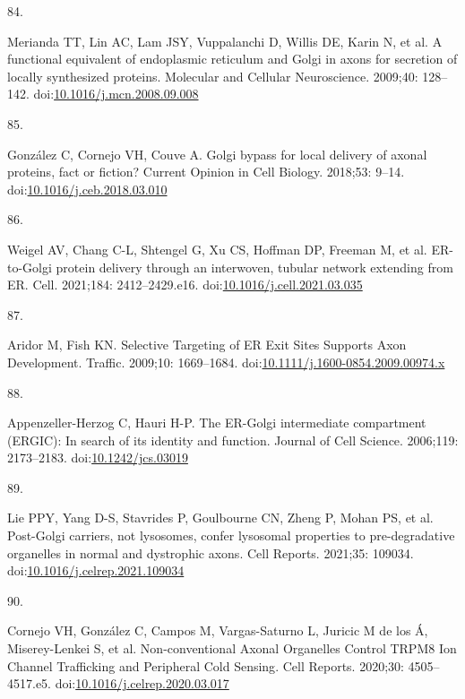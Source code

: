 \documentclass[
  12pt,
  a4paper,
]{book}
\newlength{\cslhangindent}
\newlength{\csllabelwidth}
\newlength{\cslentryspacingunit} %
\newenvironment{CSLReferences}[2] %
 {%
  \setlength{\parindent}{0pt}
  \ifodd #1
  \let\oldpar\par
  \def\par{\hangindent=\cslhangindent\oldpar}
  \fi
  \setlength{\parskip}{#2\cslentryspacingunit}
 }%
 {}
\newcommand{\CSLLeftMargin}[1]{\parbox[t]{\csllabelwidth}{#1}}
\newcommand{\CSLRightInline}[1]{\parbox[t]{\linewidth - \csllabelwidth}{#1}\break}
\begin{document}
\begin{CSLReferences}{0}{0}
\leavevmode{}%
\CSLLeftMargin{84. }%
\CSLRightInline{Merianda TT, Lin AC, Lam JSY, Vuppalanchi D, Willis DE, Karin N, et al. A functional equivalent of endoplasmic reticulum and {Golgi} in axons for secretion of locally synthesized proteins. Molecular and Cellular Neuroscience. 2009;40: 128--142. doi:\href{https://doi.org/10.1016/j.mcn.2008.09.008}{10.1016/j.mcn.2008.09.008}}

\leavevmode{}%
\CSLLeftMargin{85. }%
\CSLRightInline{González C, Cornejo VH, Couve A. Golgi bypass for local delivery of axonal proteins, fact or fiction? Current Opinion in Cell Biology. 2018;53: 9--14. doi:\href{https://doi.org/10.1016/j.ceb.2018.03.010}{10.1016/j.ceb.2018.03.010}}

\leavevmode{}%
\CSLLeftMargin{86. }%
\CSLRightInline{Weigel AV, Chang C-L, Shtengel G, Xu CS, Hoffman DP, Freeman M, et al. {ER-to-Golgi} protein delivery through an interwoven, tubular network extending from {ER}. Cell. 2021;184: 2412--2429.e16. doi:\href{https://doi.org/10.1016/j.cell.2021.03.035}{10.1016/j.cell.2021.03.035}}

\leavevmode{}%
\CSLLeftMargin{87. }%
\CSLRightInline{Aridor M, Fish KN. Selective {Targeting} of {ER Exit Sites Supports Axon Development}. Traffic. 2009;10: 1669--1684. doi:\href{https://doi.org/10.1111/j.1600-0854.2009.00974.x}{10.1111/j.1600-0854.2009.00974.x}}

\leavevmode{}%
\CSLLeftMargin{88. }%
\CSLRightInline{Appenzeller-Herzog C, Hauri H-P. The {ER-Golgi} intermediate compartment ({ERGIC}): In search of its identity and function. Journal of Cell Science. 2006;119: 2173--2183. doi:\href{https://doi.org/10.1242/jcs.03019}{10.1242/jcs.03019}}

\leavevmode{}%
\CSLLeftMargin{89. }%
\CSLRightInline{Lie PPY, Yang D-S, Stavrides P, Goulbourne CN, Zheng P, Mohan PS, et al. Post-{Golgi} carriers, not lysosomes, confer lysosomal properties to pre-degradative organelles in normal and dystrophic axons. Cell Reports. 2021;35: 109034. doi:\href{https://doi.org/10.1016/j.celrep.2021.109034}{10.1016/j.celrep.2021.109034}}

\leavevmode{}%
\CSLLeftMargin{90. }%
\CSLRightInline{Cornejo VH, González C, Campos M, Vargas-Saturno L, Juricic M de los Á, Miserey-Lenkei S, et al. Non-conventional {Axonal Organelles Control TRPM8 Ion Channel Trafficking} and {Peripheral Cold Sensing}. Cell Reports. 2020;30: 4505--4517.e5. doi:\href{https://doi.org/10.1016/j.celrep.2020.03.017}{10.1016/j.celrep.2020.03.017}}


\end{CSLReferences}
\end{document}

